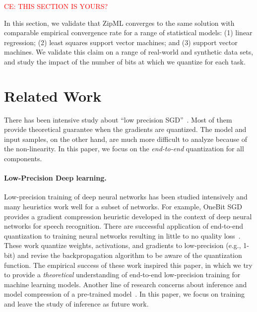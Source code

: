 \documentclass{article}
\begin{document}
\textcolor{red}{CE: THIS SECTION IS YOURS?}

In this section, we validate that ZipML 
converges to the same solution with comparable
empirical convergence rate for a range of
statistical models: (1) linear regression;
(2) least squares support vector machines;
and (3) support vector machines.
We validate this claim on a range of real-world
and synthetic data sets, and study the impact
of the number of bits at which we quantize for each task.

\section{Related Work} 

There has been intensive study about ``low precision SGD''~\cite{DeSa:NIPS:2015,Alistarh:2016:ArXiv}. 
Most of them provide
theoretical guarantee when the gradients are quantized.
The model and input samples, on the other hand, are much more difficult
to analyze because of the non-linearity. In this paper, 
we
focus on the {\em end-to-end}
quantization for all components.

\vspace{-1em}
\paragraph{Low-Precision Deep learning.}

Low-precision training of deep neural networks has been studied
intensively and many heuristics work well for a subset of networks.
For example, OneBit SGD~\cite{Frank:2014:Interspeech} provides
a gradient compression heuristic developed in the context of deep 
neural networks for speech recognition. There are successful 
application of end-to-end quantization to training neural networks
resulting in little to no quality loss~\cite{hubara2016quantized,
rastegari2016xnor,zhou2016dorefa,miyashita2016convolutional,li2016ternary,gupta2015deep}. These work quantize weights, activations, and gradients 
to low-precision (e.g., 1-bit) and revise the backpropagation 
algorithm to be aware of the quantization function.
The empirical success of these work inspired this paper, in which we try
to provide a {\em theoretical} understanding of end-to-end low-precision
training for machine learning models.
Another line of research concerns about inference and model
compression of a pre-trained model~\cite{vanhoucke2011improving,gong2014compressing,han2015deep,lin2016fixed,kim2016bitwise,kim2015compression,wu2016quantized}.
In this paper, we focus on training and leave the study of
inference as future work.
\end{document}
